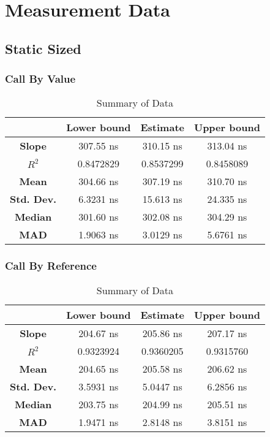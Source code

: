 \section{Measurement Data}

\subsection{Static Sized}

\subsubsection{Call By Value}
\begin{table}[H]
\centering
\begin{tabular}{|c|c|c|c|}
\hline
\textbf{} & \textbf{Lower bound} & \textbf{Estimate} & \textbf{Upper bound} \\
\hline
\textbf{Slope} & 307.55 ns & 310.15 ns & 313.04 ns \\
\hline
\textbf{$R^2$} & 0.8472829 & 0.8537299 & 0.8458089 \\
\hline
\textbf{Mean} & 304.66 ns & 307.19 ns & 310.70 ns \\
\hline
\textbf{Std. Dev.} & 6.3231 ns & 15.613 ns & 24.335 ns \\
\hline
\textbf{Median} & 301.60 ns & 302.08 ns & 304.29 ns \\
\hline
\textbf{MAD} & 1.9063 ns & 3.0129 ns & 5.6761 ns \\
\hline
\end{tabular}
\caption{Summary of Data}
\label{tab:data_summary_2}
\end{table}


\subsubsection{Call By Reference}
\begin{table}[H]
\centering
\begin{tabular}{|c|c|c|c|}
\hline
 & \textbf{Lower bound} & \textbf{Estimate} & \textbf{Upper bound} \\
\hline
\textbf{Slope} & 204.67 ns & 205.86 ns & 207.17 ns \\
\hline
\textbf{$R^2$} & 0.9323924 & 0.9360205 & 0.9315760 \\
\hline
\textbf{Mean} & 204.65 ns & 205.58 ns & 206.62 ns \\
\hline
\textbf{Std. Dev.} & 3.5931 ns & 5.0447 ns & 6.2856 ns \\
\hline
\textbf{Median} & 203.75 ns & 204.99 ns & 205.51 ns \\
\hline
\textbf{MAD} & 1.9471 ns & 2.8148 ns & 3.8151 ns \\
\hline
\end{tabular}
\caption{Summary of Data}
\label{tab:data_summary}
\end{table}

